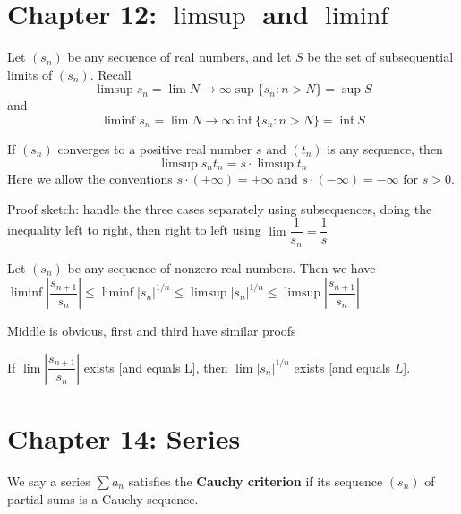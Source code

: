 \documentclass[twoside, 10pt]{article}
\begin{document}
\section*{Chapter 12: $\limsup$ and $\liminf$}
\begin{defn}
Let $(s_n)$ be any sequence of real numbers, and let $S$ be the set of subsequential limits of $(s_n)$. Recall \begin{equation*}
    \limsup{s_n} = \lim\limits{N \to \infty} \sup \{s_n: n > N\} = \sup S
\end{equation*}
and 
\begin{equation*}
    \liminf{s_n} = \lim\limits{N \to \infty} \inf\{s_n : n > N\} = \inf S
\end{equation*}
\end{defn}

\begin{thm}
If $(s_n)$ converges to a positive real number $s$ and $(t_n)$ is any sequence, then \begin{equation*}
    \limsup s_nt_n = s\cdot \limsup t_n
\end{equation*}
Here we allow the conventions $s \cdot (+\infty) = +\infty$ and $s\cdot(-\infty) = -\infty$ for $s > 0$.
\end{thm}
Proof sketch: handle the three cases separately using subsequences, doing the inequality left to right, then right to left using $\lim\dfrac{1}{s_n} = \dfrac{1}{s}$

\begin{thm}
Let $(s_n)$ be any sequence of nonzero real numbers. Then we have $\liminf\left|\dfrac{s_{n+1}}{s_n}\right| \leq \liminf |s_n|^{1/n}\leq \limsup |s_n|^{1/n} \leq \limsup\left|\dfrac{s_{n+1}}{s_n}\right|$
\end{thm}
Middle is obvious, first and third have similar proofs

\begin{cor}
If $\lim\left|\dfrac{s_{n+1}}{s_n}\right|$ exists [and equals L], then $\lim\left|s_n\right|^{1/n}$ exists [and equals $L$].
\end{cor}

\section*{Chapter 14: Series}
\begin{defn}
We say a series $\sum a_n$ satisfies the \textbf{Cauchy criterion} if its sequence $(s_n)$ of partial sums is a Cauchy sequence.
\end{defn}
\end{document}
